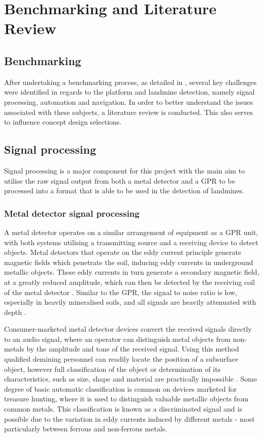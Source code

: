 \documentclass[main.tex]{subfiles}
\begin{document}
\chapter{Benchmarking and Literature Review}

\section{Benchmarking}

After undertaking a benchmarking process, as detailed in , several key challenges were identified in regards to the platform and landmine detection, namely signal processing, automation and navigation. In order to better understand the issues associated with these subjects, a literature review is conducted. This also serves to influence concept design selections. 

\section{Signal processing}
Signal processing is a major component for this project with the main aim to utilise the raw signal output from both a metal detector and a GPR to be processed into a format that is able to be used in the detection of landmines.  

\subsection{Metal detector signal processing}
A metal detector operates on a similar arrangement of equipment as a GPR unit, with both systems utilising a transmitting source and a receiving device to detect objects. Metal detectors that operate on the eddy current principle generate magnetic fields which penetrate the soil, inducing eddy currents in underground metallic objects. These eddy currents in turn generate a secondary magnetic field, at a greatly reduced amplitude, which can then be detected by the receiving coil of the metal detector \parencite{Candy2008}. Similar to the GPR, the signal to noise ratio is low, especially in heavily mineralised soils, and all signals are heavily attenuated with depth \parencite{Candy2008}.

Consumer-marketed metal detector devices convert the received signals directly to an audio signal, where an operator can distinguish metal objects from non-metals by the amplitude and tone of the received signal.  Using this method qualified demining personnel can readily locate the position of a subsurface object, however full classification of the object or determination of its characteristics, such as size, shape and material are practically impossible \parencite{Kruger2006}. Some degree of basic automatic classification is common on devices marketed for treasure hunting, where it is used to distinguish valuable metallic objects from common metals. This classification is known as a discriminated signal and is possible due to the variation in eddy currents induced by different metals - most particularly between ferrous and non-ferrous metals. 
\end{document}
